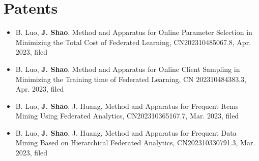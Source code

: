 \documentclass[10pt,a4paper]{article}
\begin{document}
\section*{\color{sectioncolor}Patents}
\begin{itemize}[leftmargin=*, label=\textcolor{accentcolor}{\textbullet}, itemsep=0.4em]
    \item B. Luo, \textbf{J. Shao}, Method and Apparatus for Online Parameter Selection in Minimizing the Total Cost of Federated Learning, CN202310485067.8, Apr. 2023, filed
    \item B. Luo, \textbf{J. Shao}, Method and Apparatus for Online Client Sampling in Minimizing the Training time of Federated Learning, CN 202310484383.3, Apr. 2023, filed
    \item B. Luo, \textbf{J. Shao}, J. Huang, Method and Apparatus for Frequent Items Mining Using Federated Analytics, CN202310365167.7, Mar. 2023, filed
    \item B. Luo, \textbf{J. Shao}, J. Huang, Method and Apparatus for Frequent Data Mining Based on Hierarchical Federated Analytics, CN202310330791.3, Mar. 2023, filed
\end{itemize}
\vspace{0.8em}


\end{document}
